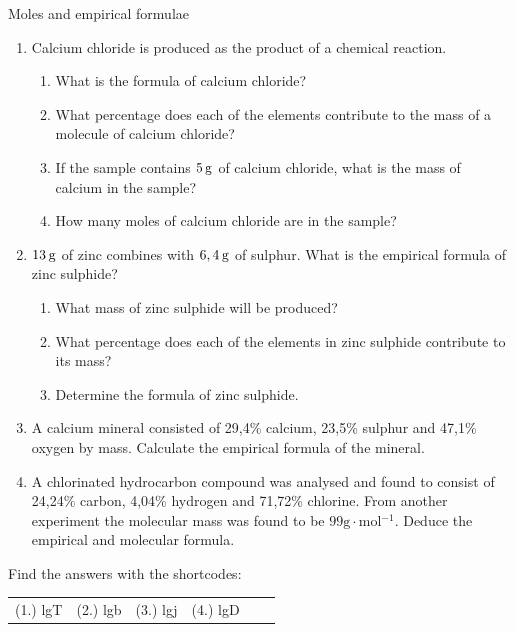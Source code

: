             \begin{exercises}{Moles and empirical formulae
      }
            \nopagebreak
      \label{m38712*id281924}\begin{enumerate}[noitemsep, label=\textbf{\arabic*}. ] 
            \label{m38712*uid73}\item Calcium chloride is produced as the product of a chemical reaction.
\label{m38712*id281940}\begin{enumerate}[noitemsep, label=\textbf{\alph*}. ] 
            \label{m38712*uid74}\item What is the formula of calcium chloride?
\label{m38712*uid75}\item What percentage does each of the elements contribute to the mass of a molecule of calcium chloride?
\label{m38712*uid76}\item If the sample contains $5\phantom{\rule{2pt}{0ex}}\mathrm{g}$ of calcium chloride, what is the mass of calcium in the sample?
\label{m38712*uid77}\item How many moles of calcium chloride are in the sample?
\end{enumerate}
                \label{m38712*uid78}\item $13\phantom{\rule{2pt}{0ex}}\mathrm{g}$ of zinc combines with $6,4\phantom{\rule{2pt}{0ex}}\mathrm{g}$ of sulphur. What is the empirical formula of zinc sulphide?
\label{m38712*id282007}\begin{enumerate}[noitemsep, label=\textbf{\alph*}. ] 
            \label{m38712*uid79}\item What mass of zinc sulphide will be produced?
\label{m38712*uid80}\item What percentage does each of the elements in zinc sulphide contribute to its mass?
\label{m38712*uid81}\item Determine the formula of zinc sulphide.
\end{enumerate}
                \label{m38712*uid82}\item A calcium mineral consisted of 29,4\% calcium, 23,5\% sulphur and 47,1\% oxygen by mass. Calculate the empirical formula of the mineral.\newline
\label{m38712*uid83}\item A chlorinated hydrocarbon compound was analysed and found to consist of 24,24\% carbon, 4,04\% hydrogen and 71,72\% chlorine. From another experiment the molecular mass was found to be $99\mathrm{g}\ensuremath{\cdot}\mathrm{mol}{}^{-1}$. Deduce the empirical and molecular formula.\newline
\end{enumerate}
    \label{m38712*cid7}
\par {} Find the answers with the shortcodes:
 \par \begin{tabular}[h]{cccccc}
 (1.) lgT  &  (2.) lgb  &  (3.) lgj  &  (4.) lgD  & \end{tabular}
\end{exercises}
